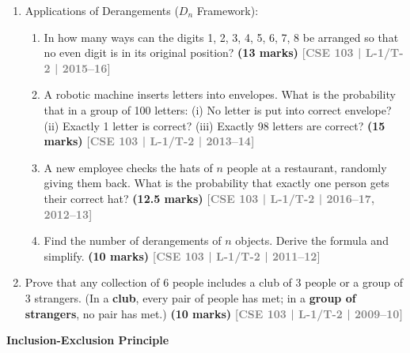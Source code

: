 \documentclass[12pt,a3paper]{article}
\newcommand{\yr}[1]{\hfill\textcolor{gray}{\small\textbf{[#1]}}}
\newcommand{\mk}[1]{\textcolor{orange!70!black}{\small\textbf{(#1 marks)}}}
\newcommand{\subtopic}[2]{%
  \vspace{10pt}
  \noindent\begin{tcolorbox}[colback=#1!8,colframe=#1,boxrule=0.6pt,arc=4pt,
    left=6pt,right=6pt,top=4pt,bottom=4pt]
    \small\bfseries\textcolor{#1}{#2}
  \end{tcolorbox}
  \vspace{2pt}
}
\begin{document}
\begin{enumerate}
\item Applications of Derangements ($D_n$ Framework):
\begin{enumerate}
  \item In how many ways can the digits 1, 2, 3, 4, 5, 6, 7, 8 be arranged so that no even digit is in its original position? \mk{13} \yr{CSE 103 | L-1/T-2 | 2015--16}
  \item A robotic machine inserts letters into envelopes. What is the probability that in a group of 100 letters: (i) No letter is put into correct envelope? (ii) Exactly 1 letter is correct? (iii) Exactly 98 letters are correct? \mk{15} \yr{CSE 103 | L-1/T-2 | 2013--14}
  \item A new employee checks the hats of $n$ people at a restaurant, randomly giving them back. What is the probability that exactly one person gets their correct hat? \mk{12.5} \yr{CSE 103 | L-1/T-2 | 2016--17, 2012--13}
  \item Find the number of derangements of $n$ objects. Derive the formula and simplify. \mk{10} \yr{CSE 103 | L-1/T-2 | 2011--12}
\end{enumerate}

\item Prove that any collection of 6 people includes a club of 3 people or a group of 3 strangers. (In a \textbf{club}, every pair of people has met; in a \textbf{group of strangers}, no pair has met.)
\mk{10} \yr{CSE 103 | L-1/T-2 | 2009--10}  

\end{enumerate}

\subtopic{cC}{Inclusion-Exclusion Principle}
\label{sub:s11-inclusion}
\end{document}
